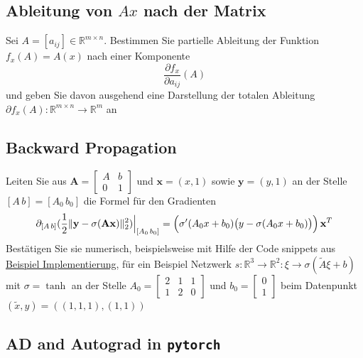 \documentclass[
]{book}
\theoremstyle{definition}
\theoremstyle{definition}
\theoremstyle{definition}
\theoremstyle{definition}
\theoremstyle{remark}
\begin{document}
\hypertarget{ableitung-von-ax-nach-der-matrix}{%
\subsection{\texorpdfstring{Ableitung von \(Ax\) nach der Matrix}{Ableitung von Ax nach der Matrix}}\label{ableitung-von-ax-nach-der-matrix}}

Sei \(A=[a_{ij}]\in \mathbb R^{m\times n}\). Bestimmen Sie partielle Ableitung der
Funktion \(f_x(A)=A(x)\) nach einer Komponente
\begin{equation*}
\frac{\partial {f_x}}{{\partial a_{ij}}}(A)
\end{equation*}
und geben Sie davon ausgehend eine Darstellung der totalen Ableitung \(\partial f_x(A) \colon \mathbb R^{m\times n}\to \mathbb R^{m}\) an

\hypertarget{backward-propagation}{%
\subsection{Backward Propagation}\label{backward-propagation}}

Leiten Sie aus \(\mathbf A = \begin{bmatrix} A & b \\ 0 & 1 \end{bmatrix}\) und
\(\mathbf x = (x, 1)\) sowie \(\mathbf y = (y, 1)\)
an der Stelle \([A\,b]=[A_0\, b_0]\) die Formel für den Gradienten
\begin{equation*}
\partial_{[A\,b]} (\frac 12 \|\mathbf y-\sigma(\mathbf A\mathbf x)\|_2^2)\Bigr|_{[A_0\, b_0]}=\Bigl (\sigma'(A_0x+b_0)\bigr (y-\sigma(A_0x+b_0)\bigr )\Bigr)\,\mathbf x^T
\end{equation*}
Bestätigen Sie sie numerisch, beispielsweise mit Hilfe der Code snippets aus
\protect\hyperlink{beispiel-implementierung}{Beispiel Implementierung},
für ein Beispiel Netzwerk \(s\colon \mathbb R^{3}\to \mathbb R^{2}\colon \xi \to \sigma(\tilde A\xi + b)\)
mit \(\sigma = \tanh\) an der Stelle
\(A_0=\begin{bmatrix}2 & 1 & 1 \\ 1 & 2& 0 \end{bmatrix}\) und
\(b_0=\begin{bmatrix}0\\1 \end{bmatrix}\) beim Datenpunkt \((\tilde x, y) = ((1,1,1), (1, 1))\)

\hypertarget{ad-and-autograd-in-pytorch}{%
\subsection{\texorpdfstring{AD and Autograd in \texttt{pytorch}}{AD and Autograd in pytorch}}\label{ad-and-autograd-in-pytorch}}
\end{document}
